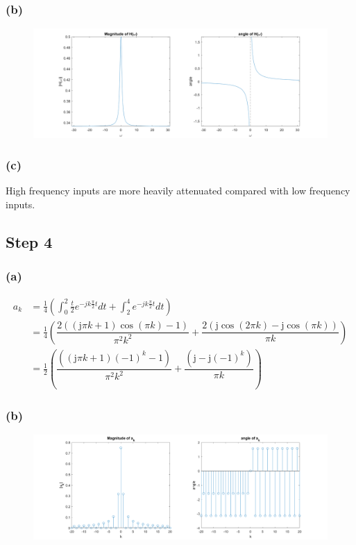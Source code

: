 \documentclass[12pt]{article}
\begin{document}
\subsubsection*{(b)}

\begin{center}
\begin{figure}[h]\includegraphics[width=15cm]{fig7}
\end{figure}
\end{center}
\FloatBarrier
\subsubsection*{(c)}
High frequency inputs are more heavily attenuated compared with low frequency inputs.
\subsection*{Step 4}
\subsubsection*{(a)}
\begin{align*}
a_k&=\frac{1}{4}\left(\int_{0}^{2}\frac{t}{2}e^{-jk\frac{\pi}{2}t}dt+\int_{2}^{4}e^{-jk\frac{\pi}{2}t}dt\right)\\
&=\frac{1}{4}\left(\dfrac{2\left(\left(\mathrm{j}{\pi}k+1\right)\cos\left({\pi}k\right)-1\right)}{{\pi}^2k^2}+\dfrac{2\left(\mathrm{j}\cos\left(2{\pi}k\right)-\mathrm{j}\cos\left({\pi}k\right)\right)}{{\pi}k}\right)\\
&=\boxed{\frac{1}{2}\left(\dfrac{\left(\left(\mathrm{j}{\pi}k+1\right)(-1)^k-1\right)}{{\pi}^2k^2}+\dfrac{\left(\mathrm{j}-\mathrm{j}(-1)^k\right)}{{\pi}k}\right)}
\end{align*}
\subsubsection*{(b)}

\begin{center}
\begin{figure}[h]\includegraphics[width=15cm]{fig8}
\end{figure}
\end{center}
\FloatBarrier
\end{document}
